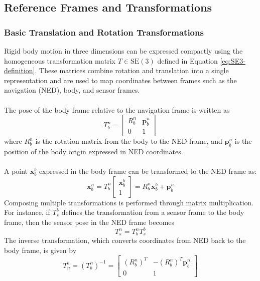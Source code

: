 \subsection{Reference Frames and Transformations}
\subsubsection{Basic Translation and Rotation Transformations}
Rigid body motion in three dimensions can be expressed compactly using the homogeneous transformation matrix $T \in \mathrm{SE}(3)$ defined in Equation \ref{eq:SE3-definition}. These matrices combine rotation and translation into a single representation and are used to map coordinates between frames such as the navigation (NED), body, and sensor frames.  
\\ \\
The pose of the body frame relative to the navigation frame is written as
\begin{equation}
    T_{b}^{n} =
    \begin{bmatrix}
        R_{b}^{n} & \mathbf{p}_{b}^{n} \\
        0 & 1
    \end{bmatrix}
    \label{eq:system-modeling-se3-transform-structure}
\end{equation}
\noindent
where $R_{b}^{n}$ is the rotation matrix from the body to the NED frame, and $\mathbf{p}_{b}^{n}$ is the position of the body origin expressed in NED coordinates.
\\ \\
A point $\mathbf{x}_{b}^{b}$ expressed in the body frame can be transformed to the NED frame as:
\begin{equation}
    \mathbf{x}_{b}^{n}=
    T_{b}^{n}
    \begin{bmatrix}
        \mathbf{x}_{b}^{b} \\ 1
    \end{bmatrix}
    = R_{b}^{n}\mathbf{x}_{b}^{b} + \mathbf{p}_{b}^{n}
    \label{eq:system-modeling-se3-transform-point}
\end{equation}
\noindent
Composing multiple transformations is performed through matrix multiplication. For instance, if $T_{s}^{b}$ defines the transformation from a sensor frame to the body frame, then the sensor pose in the NED frame becomes
$$
    T_{s}^{n} = T_{b}^{n} T_{s}^{b}
$$
The inverse transformation, which converts coordinates from NED back to the body frame, is given by
$$
    T_{n}^{b} = (T_{b}^{n})^{-1} =
    \begin{bmatrix}
        (R_{b}^{n})^T & -(R_{b}^{n})^T \mathbf{p}_{b}^{n} \\
        0 & 1
    \end{bmatrix}
$$
